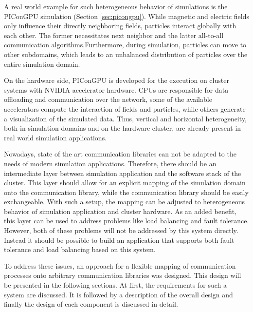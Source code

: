 A real world example for such heterogeneous behavior of simulations is
the PIConGPU simulation (Section \ref{sec:picongpu}). While magnetic
and electric fields only influence their directly neighboring fields,
particles interact globally with each other. The former necessitates
next neighbor and the latter all-to-all communication
algorithms.Furthermore, during simulation, particles can move to other
subdomains, which leads to an unbalanced distribution of particles
over the entire simulation domain.

On the hardware side, PIConGPU is developed for the execution on
cluster systems with NVIDIA accelerator hardware.  CPUs are
responsible for data offloading and communication over the network,
some of the available accelerators compute the interaction of fields
and particles, while others generate a visualization of the simulated
data. Thus, vertical and horizontal heterogeneity, both in simulation
domains and on the hardware cluster, are already present in real world
simulation applications.

Nowadays, state of the art communication libraries can not be adapted
to the needs of modern simulation applications.  Therefore, there
should be an intermediate layer between simulation application and the
software stack of the cluster. This layer should allow for an explicit
mapping of the simulation domain onto the communication library, while
the communication library should be easily exchangeable. With such a
setup, the mapping can be adjusted to heterogeneous behavior of
simulation application and cluster hardware.  As an added benefit,
this layer can be used to address problems like load balancing and
fault tolerance. However, both of these problems will not be addressed
by this system directly. Instead it should be possible to build an
application that supports both fault tolerance and load balancing
based on this system.

To address these issues, an approach for a flexible mapping of
communication processes onto arbitrary communication libraries was
designed. This design will be presented in the following
sections. At first, the requirements for such a system are
discussed. It is followed by a description of the overall design and
finally the design of each component is discussed in detail.

